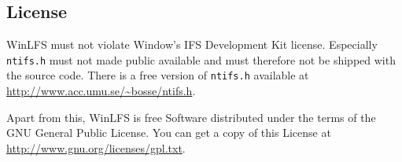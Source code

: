 \subsection{License}
WinLFS must not violate Window's IFS Development Kit license. Especially \verb~ntifs.h~ must not made public available and must therefore not be shipped with the source code. There is a free version of \verb~ntifs.h~ available at \url{http://www.acc.umu.se/~bosse/ntifs.h}.

Apart from this, WinLFS is free Software distributed under the terms of the GNU General Public License. You can get a copy of this License at \url{http://www.gnu.org/licenses/gpl.txt}.

